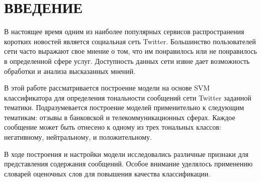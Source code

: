 \newpage
\part*{\large \centering ВВЕДЕНИЕ}

В настоящее время одним из наиболее популярных сервисов распространения коротких
новостей является социальная сеть Twitter. Большинство пользователей сети часто
выражают свое мнение о том, что им понравилось или не понравилось в определенной
сфере услуг. Доступность данных сети извне дает возможность обработки и анализа
высказанных мнений.

В этой работе рассматривается построение модели на основе SVM классификатора для
определения тональности сообщений сети Twitter заданной тематики. Подразумевается
построение моделей применительно к следующим тематикам: отзывы в банковской и
телекоммуникационных сферах. Каждое сообщение может быть отнесено к одному из
трех тональных классов: негативному, нейтральному, и положительному.

В ходе построения и настройки модели исследовались различные признаки для
представления содержания сообщений. Особое внимание уделялось применению
словарей оценочных слов для повышения качества классификации.

\newpage
